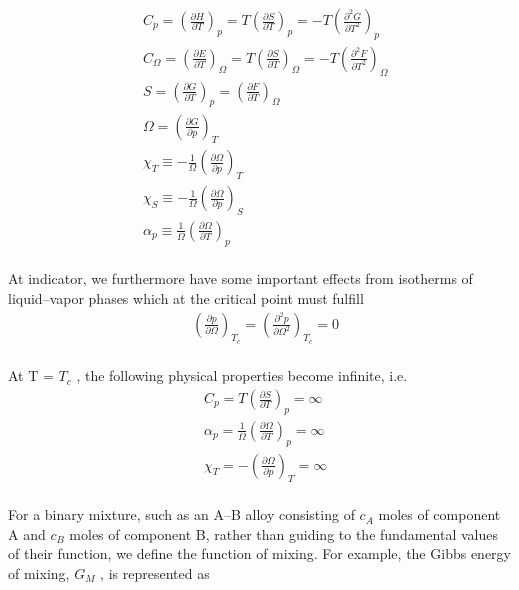 \documentclass[12pt]{article}
\newcommand*{\1}{\hspace{1pt}}
\begin{document}
    \begin{align}
    &  C_{p} = \left(\frac{\partial H }{ \partial T}\right)_{p} = T \left(\frac{\partial S}{\partial T} \right) _{p} = -T \left(\frac{\partial ^2 G }{ \partial T^2}\right) _p \\
    & C_{\Omega} = \left(\frac{\partial E }{ \partial T}\right)_{\Omega} = T \left(\frac{\partial S}{\partial T} \right) _{\Omega} = -T \left(\frac{\partial ^2 F }{ \partial T^2}\right) _\Omega \\
    & S = \left(\frac{\partial G }{ \partial T}\right)_{p} =  \left(\frac{\partial F}{\partial T} \right) _{\Omega} \\
    & \Omega  = \left(\frac{\partial G }{ \partial p}\right)_{T} \\
    & \chi _T  \equiv  - \frac{1}{ \Omega} \left(\frac{\partial  \Omega }{ \partial p}\right)_{T} \\ 
    & \chi _S  \equiv  - \frac{1}{ \Omega} \left(\frac{\partial  \Omega }{ \partial p}\right)_{S} \\
    & \alpha  _p  \equiv  \frac{1}{ \Omega} \left(\frac{\partial  \Omega }{ \partial T}\right)_{p}  
    \end{align}\\

    At indicator, we furthermore have some important effects from isotherms of liquid–vapor phases which at the critical point must fulfill
    \begin{align}
    & \left(\frac{\partial p}{\partial \Omega} \right) _{T_{c}} = \left(\frac{\partial ^2 p}{\partial \Omega ^2} \right) _{T_{c}} =0
    \end{align}\\

    At T = $T_c$ , the following physical properties become infinite, i.e.\\


    \begin{align}
    & C_p = T \left(\frac{\partial S}{\partial T} \right) _p = \infty \\
    & \alpha _p = \frac{1}{\Omega} \left(\frac{\partial \Omega}{\partial T} \right) _p = \infty \\
    & \chi _T = -\left(\frac{\partial \Omega}{\partial p} \right) _T = \infty 
    \end{align}\\

    For a binary mixture, such as an A–B alloy consisting of $c_A$ moles of component A and $c_B$
    moles of component B, rather than guiding to the fundamental values of their function, 
    we define the function of mixing. For example, the Gibbs energy of mixing, $G_M$ , is represented as
\end{document}
